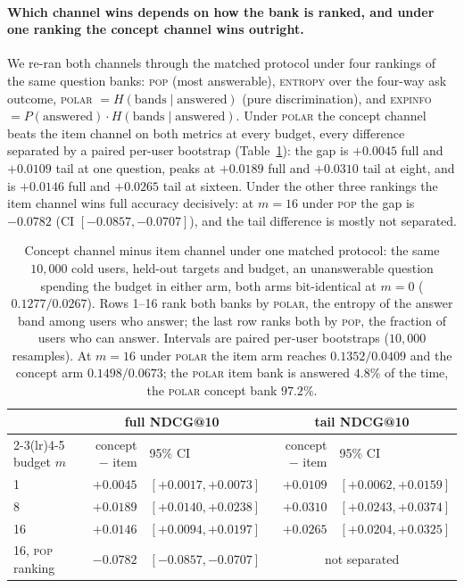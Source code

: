 \documentclass[manuscript,screen]{acmart}
\begin{document}
\paragraph{Which channel wins depends on how the bank is ranked, and under one ranking the concept channel wins outright.} We re-ran both channels through the matched protocol under four rankings of the same question banks: \textsc{pop} (most answerable), \textsc{entropy} over the four-way ask outcome, \textsc{polar} $=H(\text{bands}\mid\text{answered})$ (pure discrimination), and \textsc{expinfo} $=P(\text{answered})\cdot H(\text{bands}\mid\text{answered})$. Under \textsc{polar} the concept channel beats the item channel on both metrics at every budget, every difference separated by a paired per-user bootstrap (Table~\ref{tab:polar}): the gap is $+0.0045$ full and $+0.0109$ tail at one question, peaks at $+0.0189$ full and $+0.0310$ tail at eight, and is $+0.0146$ full and $+0.0265$ tail at sixteen. Under the other three rankings the item channel wins full accuracy decisively: at $m{=}16$ under \textsc{pop} the gap is $-0.0782$ (CI $[-0.0857,-0.0707]$), and the tail difference is mostly not separated.

\begin{table}[t]\centering\small
\setlength{\tabcolsep}{5pt}
\begin{tabular}{l r@{\;}l r@{\;}l}
\toprule
& \multicolumn{2}{c}{full NDCG@10} & \multicolumn{2}{c}{tail NDCG@10} \\
\cmidrule(lr){2-3}\cmidrule(lr){4-5}
budget $m$ & concept $-$ item & 95\% CI & concept $-$ item & 95\% CI \\
\midrule
1  & $+0.0045$ & $[+0.0017,+0.0073]$ & $+0.0109$ & $[+0.0062,+0.0159]$ \\
8  & $+0.0189$ & $[+0.0140,+0.0238]$ & $+0.0310$ & $[+0.0243,+0.0374]$ \\
16 & $+0.0146$ & $[+0.0094,+0.0197]$ & $+0.0265$ & $[+0.0204,+0.0325]$ \\
\midrule
16, \textsc{pop} ranking & $-0.0782$ & $[-0.0857,-0.0707]$ & \multicolumn{2}{c}{not separated} \\
\bottomrule
\end{tabular}
\caption{Concept channel minus item channel under one matched protocol: the same $10{,}000$ cold users, held-out targets and budget, an unanswerable question spending the budget in either arm, both arms bit-identical at $m{=}0$ ($0.1277/0.0267$). Rows 1--16 rank both banks by \textsc{polar}, the entropy of the answer band among users who answer; the last row ranks both by \textsc{pop}, the fraction of users who can answer. Intervals are paired per-user bootstraps ($10{,}000$ resamples). At $m{=}16$ under \textsc{polar} the item arm reaches $0.1352/0.0409$ and the concept arm $0.1498/0.0673$; the \textsc{polar} item bank is answered $4.8\%$ of the time, the \textsc{polar} concept bank $97.2\%$.}
\label{tab:polar}
\end{table}
\end{document}
